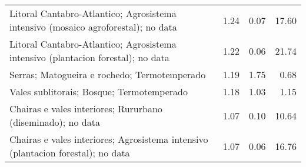 \begin{table}[p]
\begin{tabular}{lrrr}
  Litoral Cantabro-Atlantico; Agrosistema intensivo (mosaico agroforestal); no data & 1.24 & 0.07 & 17.60 \\ 
  Litoral Cantabro-Atlantico; Agrosistema intensivo (plantacion forestal); no data & 1.22 & 0.06 & 21.74 \\ 
  Serras; Matogueira e rochedo; Termotemperado & 1.19 & 1.75 & 0.68 \\ 
  Vales sublitorais; Bosque; Termotemperado & 1.18 & 1.03 & 1.15 \\ 
  Chairas e vales interiores; Rururbano (diseminado); no data & 1.07 & 0.10 & 10.64 \\ 
  Chairas e vales interiores; Agrosistema intensivo (plantacion forestal); no data & 1.07 & 0.06 & 16.76 \\ 
   \hline
\end{tabular}
\end{table}
